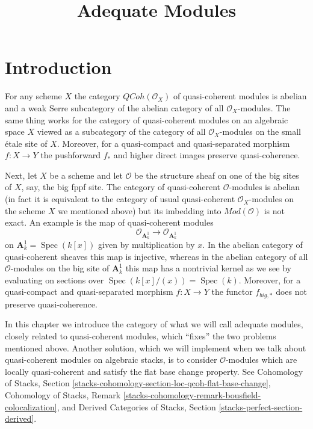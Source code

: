 \documentclass{stacks-project}
\theoremstyle{plain}
\theoremstyle{definition}
\theoremstyle{remark}
\numberwithin{equation}{subsection}
\def\Spec{\mathop{\mathrm{Spec}}}
\def\QCoh{\mathit{QCoh}}
\begin{document}
\title{Adequate Modules}


\maketitle

\label{section-phantom}

\tableofcontents

\section{Introduction}
\label{section-introduction}

\noindent
For any scheme $X$ the category $\QCoh(\mathcal{O}_X)$
of quasi-coherent modules is abelian and a weak Serre subcategory
of the abelian category of all $\mathcal{O}_X$-modules. The same
thing works for the category of quasi-coherent modules on
an algebraic space $X$ viewed as a subcategory of the category
of all $\mathcal{O}_X$-modules on the small \'etale site of $X$.
Moreover, for a quasi-compact and quasi-separated morphism
$f : X \to Y$ the pushforward $f_*$ and higher direct images
preserve quasi-coherence.

\medskip\noindent
Next, let $X$ be a scheme and let $\mathcal{O}$ be the structure
sheaf on one of the big sites of $X$, say, the big fppf site.
The category of quasi-coherent $\mathcal{O}$-modules is abelian
(in fact it is equivalent to the category of usual quasi-coherent
$\mathcal{O}_X$-modules on the scheme $X$ we mentioned above)
but its imbedding into $\textit{Mod}(\mathcal{O})$ is not exact.
An example is the map of quasi-coherent modules
$$
\mathcal{O}_{\mathbf{A}^1_k}
\longrightarrow
\mathcal{O}_{\mathbf{A}^1_k}
$$
on $\mathbf{A}^1_k = \Spec(k[x])$ given by multiplication by $x$.
In the abelian category of quasi-coherent sheaves this map is injective,
whereas in the abelian category of all $\mathcal{O}$-modules on the
big site of $\mathbf{A}^1_k$ this map has a nontrivial kernel as we
see by evaluating on sections over $\Spec(k[x]/(x)) = \Spec(k)$.
Moreover, for a quasi-compact and quasi-separated morphism
$f : X \to Y$ the functor $f_{big, *}$ does not preserve quasi-coherence.

\medskip\noindent
In this chapter we introduce the category of what we will call
adequate modules, closely related to quasi-coherent modules, which
``fixes'' the two problems mentioned above. Another solution,
which we will implement when we talk about quasi-coherent modules
on algebraic stacks, is to consider $\mathcal{O}$-modules which
are locally quasi-coherent and satisfy the flat base change property.
See Cohomology of Stacks, Section
\ref{stacks-cohomology-section-loc-qcoh-flat-base-change},
Cohomology of Stacks, Remark
\ref{stacks-cohomology-remark-bousfield-colocalization}, and
Derived Categories of Stacks, Section
\ref{stacks-perfect-section-derived}.
\end{document}
